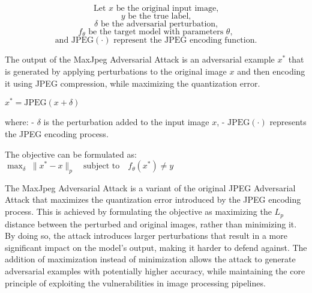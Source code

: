 \[
\text{Let } x \text{ be the original input image,}
\]
\[
y \text{ be the true label,}
\]
\[
\delta \text{ be the adversarial perturbation,}
\]
\[
f_{\theta} \text{ be the target model with parameters } \theta,  
\]
\[
\text{and } \text{JPEG}(\cdot) \text{ represent the JPEG encoding function.}
\]

The output of the MaxJpeg Adversarial Attack is an adversarial example $x^*$ that is generated by applying perturbations to the original image $x$ and then encoding it using JPEG compression, while maximizing the quantization error.

$x^* = \text{JPEG}(x + \delta)$

where:
- $\delta$ is the perturbation added to the input image $x$,
- $\text{JPEG}(\cdot)$ represents the JPEG encoding process.

The objective can be formulated as:
$\max_{\delta} \; \|x^* - x\|_p \quad \text{subject to} \quad f_\theta(x^*) \neq y$

The MaxJpeg Adversarial Attack is a variant of the original JPEG Adversarial Attack that maximizes the quantization error introduced by the JPEG encoding process. This is achieved by formulating the objective as maximizing the $L_p$ distance between the perturbed and original images, rather than minimizing it. By doing so, the attack introduces larger perturbations that result in a more significant impact on the model's output, making it harder to defend against. The addition of maximization instead of minimization allows the attack to generate adversarial examples with potentially higher accuracy, while maintaining the core principle of exploiting the vulnerabilities in image processing pipelines.